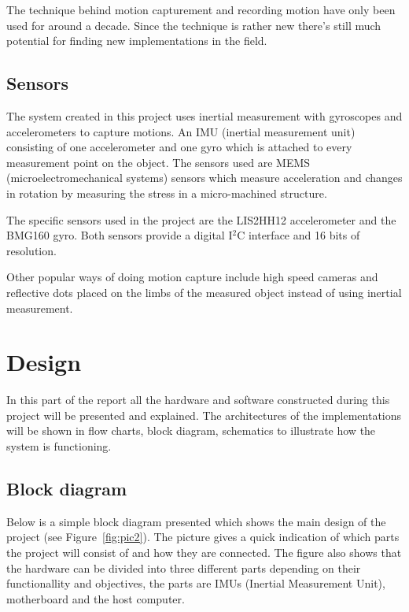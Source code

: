 \documentclass[a4paper, 12pt]{article}
\begin{document}
The technique behind motion capturement and recording motion have only been used for around a decade. Since the technique is rather new there's still much potential for finding new implementations in the field.
 

    

  
\subsection*{Sensors}
The system created in this project uses inertial measurement with gyroscopes and accelerometers to capture motions. An IMU (inertial measurement unit) consisting of one accelerometer and one gyro which is attached to every measurement point on the object. The sensors used are MEMS (microelectromechanical systems) sensors which measure acceleration and changes in rotation by measuring the stress in a micro-machined structure.\cite{mems}

The specific sensors used in the project are the LIS2HH12\cite{accelerometer} accelerometer and the BMG160\cite{gyro} gyro. Both sensors provide a digital I$^2$C interface and 16 bits of resolution.

Other popular ways of doing motion capture include high speed cameras and reflective dots placed on the limbs of the measured object instead of using inertial measurement.\cite{wiki}

\section*{Design}
In this part of the report all the hardware and software constructed during this project will be presented and explained. The architectures of the implementations will be shown in flow charts, block diagram, schematics to illustrate how the system is functioning.  

\subsection*{Block diagram}
Below is a simple block diagram presented which shows the main design of the project (see Figure~\ref{fig:pic2}). The picture gives a quick indication of which parts the project will consist of and how they are connected. The figure also shows that the hardware can be divided into three different parts depending on their functionallity and objectives, the parts are IMUs (Inertial Measurement Unit), motherboard and the host computer.     
\end{document}
